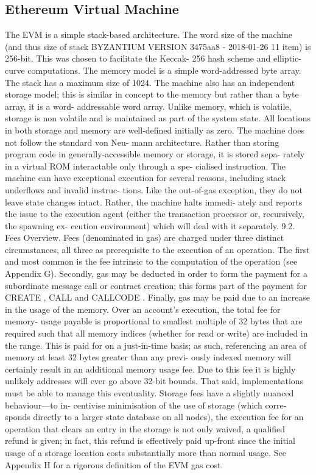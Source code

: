 \documentclass[10pt,a4paper,leqno,bibliography=totoc]{scrartcl}
\newenvironment{alphafootnotes}
{\par\edef\savedfootnotenumber{\number\value{footnote}}
\renewcommand{\thefootnote}{\alph{footnote}}
\setcounter{footnote}{0}}
{\par\setcounter{footnote}{\savedfootnotenumber}}
\begin{document}
\begin{alphafootnotes}
\begin{multicols*}{2}
		\subsection{Ethereum Virtual Machine}
			The EVM is a simple stack-based architecture. The word size of the machine (and thus size of stack BYZANTIUM VERSION 3475aa8 - 2018-01-26 11 item) is 256-bit. This was chosen to facilitate the Keccak- 256 hash scheme and elliptic-curve computations. The memory model is a simple word-addressed byte array. The stack has a maximum size of 1024. The machine also has an independent storage model; this is similar in concept to the memory but rather than a byte array, it is a word- addressable word array. Unlike memory, which is volatile, storage is non volatile and is maintained as part of the system state. All locations in both storage and memory are well-defined initially as zero. The machine does not follow the standard von Neu- mann architecture. Rather than storing program code in generally-accessible memory or storage, it is stored sepa- rately in a virtual ROM interactable only through a spe- cialised instruction. The machine can have exceptional execution for several reasons, including stack underflows and invalid instruc- tions. Like the out-of-gas exception, they do not leave state changes intact. Rather, the machine halts immedi- ately and reports the issue to the execution agent (either the transaction processor or, recursively, the spawning ex- ecution environment) which will deal with it separately. 9.2. Fees Overview. Fees (denominated in gas) are charged under three distinct circumstances, all three as prerequisite to the execution of an operation. The first and most common is the fee intrinsic to the computation of the operation (see Appendix G). Secondly, gas may be deducted in order to form the payment for a subordinate message call or contract creation; this forms part of the payment for CREATE , CALL and CALLCODE . Finally, gas may be paid due to an increase in the usage of the memory. Over an account’s execution, the total fee for memory- usage payable is proportional to smallest multiple of 32 bytes that are required such that all memory indices (whether for read or write) are included in the range. This is paid for on a just-in-time basis; as such, referencing an area of memory at least 32 bytes greater than any previ- ously indexed memory will certainly result in an additional memory usage fee. Due to this fee it is highly unlikely addresses will ever go above 32-bit bounds. That said, implementations must be able to manage this eventuality. Storage fees have a slightly nuanced behaviour—to in- centivise minimisation of the use of storage (which corre- sponds directly to a larger state database on all nodes), the execution fee for an operation that clears an entry in the storage is not only waived, a qualified refund is given; in fact, this refund is effectively paid up-front since the initial usage of a storage location costs substantially more than normal usage. See Appendix H for a rigorous definition of the EVM gas cost.\supercite{Wood2017}

\end{multicols*}
\end{alphafootnotes}
\end{document}
